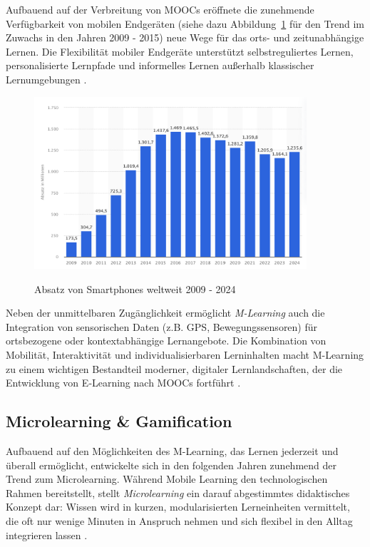 Aufbauend auf der Verbreitung von MOOCs eröffnete die zunehmende Verfügbarkeit von mobilen Endgeräten (siehe dazu Abbildung~\ref{fig:absatz_smartphones} für den Trend im Zuwachs in den Jahren 2009 - 2015) neue Wege für das orts- und zeitunabhängige Lernen. Die Flexibilität mobiler Endgeräte unterstützt selbstreguliertes Lernen, personalisierte Lernpfade und informelles Lernen außerhalb klassischer Lernumgebungen \parencite[S.~306]{nolting_strukturiertes_2004}.

\begin{figure}[htbp]
    \centering
    \includegraphics[width=0.90\textwidth]{img/Absatz von Smartphones.png}
    \caption{Absatz von Smartphones weltweit 2009 - 2024}
	\cite{statista_absatz_2025}
    \label{fig:absatz_smartphones}
\end{figure}

Neben der unmittelbaren Zugänglichkeit ermöglicht \textit{M-Learning} auch die Integration von sensorischen Daten (z.B. GPS, Bewegungssensoren) für ortsbezogene oder kontextabhängige Lernangebote. Die Kombination von Mobilität, Interaktivität und individualisierbaren Lerninhalten macht M-Learning zu einem wichtigen Bestandteil moderner, digitaler Lernlandschaften, der die Entwicklung von E‑Learning nach MOOCs fortführt \parencite[S.~10]{sharples_theory_2010}.

\subsection{Microlearning \& Gamification}

Aufbauend auf den Möglichkeiten des M-Learning, das Lernen jederzeit und überall ermöglicht, entwickelte sich in den folgenden Jahren zunehmend der Trend zum Microlearning. Während Mobile Learning den technologischen Rahmen bereitstellt, stellt \textit{Microlearning} ein darauf abgestimmtes didaktisches Konzept dar: Wissen wird in kurzen, modularisierten Lerneinheiten vermittelt, die oft nur wenige Minuten in Anspruch nehmen und sich flexibel in den Alltag integrieren lassen \parencites[S.~18ff]{hug_outline_2007}[S.~5ff]{buchem_microlearning_2010}. 


